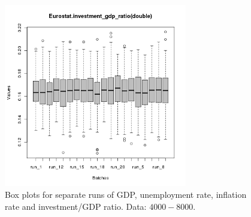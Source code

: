 \begin{figure}[ht!]
\begin{minipage}{17cm}
\includegraphics[width=8cm]{./batch/tax_0.08/Eurostat-investment_gdp_ratio-batches.png}
\end{minipage}
\caption{Box plots for separate runs of GDP, unemployment rate, inflation rate and investment/GDP ratio. Data: $4000-8000$.}
\label{Figure: run batch}
\end{figure}
